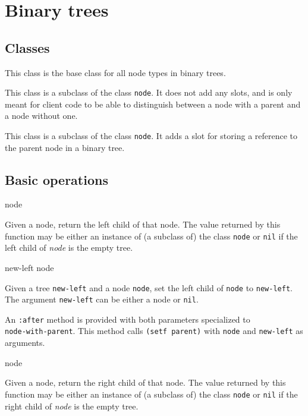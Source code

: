 \chapter{Binary trees}
\label{chap-binary-trees}

\section{Classes}


This class is the base class for all node types in binary trees.


This class is a subclass of the class \texttt{node}.  It does not add
any slots, and is only meant for client code to be able to distinguish
between a node with a parent and a node without one.


This class is a subclass of the class \texttt{node}.  It adds a slot
for storing a reference to the parent node in a binary tree.

\section{Basic operations}

 {node}

Given a node, return the left child of that node.  The value returned
by this function may be either an instance of (a subclass of) the
class \texttt{node} or \texttt{nil} if the left child of \textit{node}
is the empty tree.

 {new-left node}

Given a tree \texttt{new-left} and a node \texttt{node}, set the left
child of \texttt{node} to \texttt{new-left}.  The argument
\texttt{new-left} can be either a node or \texttt{nil}.

An \texttt{:after} method is provided with both parameters specialized
to\\ \texttt{node-with-parent}.  This method calls \texttt{(setf
  parent)} with \texttt{node} and \texttt{new-left} as arguments.

 {node}

Given a node, return the right child of that node.  The value returned
by this function may be either an instance of (a subclass of) the
class \texttt{node} or \texttt{nil} if the right child of
\textit{node} is the empty tree.

